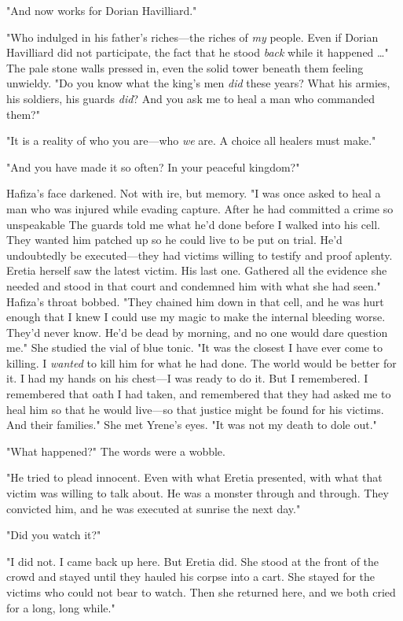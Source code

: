 "And now works for Dorian Havilliard."

"Who indulged in his father's riches---the riches of \emph{my} people. Even if Dorian Havilliard did not participate, the fact that he stood \emph{back} while it happened \ldots" The pale stone walls pressed in, even the solid tower beneath them feeling unwieldy. "Do you know what the king's men \emph{did} these years? What his armies, his soldiers, his guards \emph{did}? And you ask me to heal a man who commanded them?"

"It is a reality of who you are---who \emph{we} are. A choice all healers must make."

"And you have made it so often? In your peaceful kingdom?"

Hafiza's face darkened. Not with ire, but memory. "I was once asked to heal a man who was injured while evading capture. After he had committed a crime so unspeakable  The guards told me what he'd done before I walked into his cell. They wanted him patched up so he could live to be put on trial. He'd undoubtedly be executed---they had victims willing to testify and proof aplenty. Eretia herself saw the latest victim. His last one. Gathered all the evidence she needed and stood in that court and condemned him with what she had seen." Hafiza's throat bobbed. "They chained him down in that cell, and he was hurt enough that I knew I could use my magic to make the internal bleeding worse. They'd never know. He'd be dead by morning, and no one would dare question me." She studied the vial of blue tonic. "It was the closest I have ever come to killing. I \emph{wanted} to kill him for what he had done. The world would be better for it. I had my hands on his chest---I was ready to do it. But I remembered. I remembered that oath I had taken, and remembered that they had asked me to heal him so that he would live---so that justice might be found for his victims. And their families." She met Yrene's eyes. "It was not my death to dole out."

"What happened?" The words were a wobble.

"He tried to plead innocent. Even with what Eretia presented, with what that victim was willing to talk about. He was a monster through and through. They convicted him, and he was executed at sunrise the next day."

"Did you watch it?"

"I did not. I came back up here. But Eretia did. She stood at the front of the crowd and stayed until they hauled his corpse into a cart. She stayed for the victims who could not bear to watch. Then she returned here, and we both cried for a long, long while."

